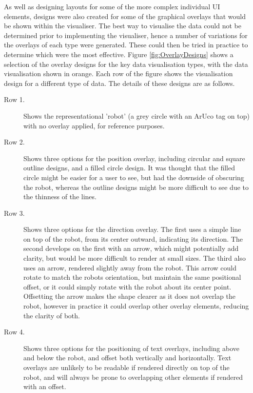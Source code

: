 As well as designing layouts for some of the more complex individual UI elements, designs were also created for some of the graphical overlays that would be shown within the visualiser. The best way to visualise the data could not be determined prior to implementing the visualiser, hence a number of variations for the overlays of each type were generated. These could then be tried in practice to determine which were the most effective. Figure \ref{fig:OverlayDesigns} shows a selection of the overlay designs for the key data visualisation types, with the data visualisation shown in orange. Each row of the figure shows the visualisation design for a different type of data. The details of these designs are as follows.

\begin{description}
\item [Row 1.] Shows the representational 'robot' (a grey circle with an ArUco tag on top) with no overlay applied, for reference purposes. 

\item [Row 2.] Shows three options for the position overlay, including circular and square outline designs, and a filled circle design. It was thought that the filled circle might be easier for a user to see, but had the downside of obscuring the robot, whereas the outline designs might be more difficult to see due to the thinness of the lines.

\item [Row 3.] Shows three options for the direction overlay. The first uses a simple line on top of the robot, from its center outward, indicating its direction. The second develops on the first with an arrow, which might potentially add clarity, but would be more difficult to render at small sizes. The third also uses an arrow, rendered slightly away from the robot. This arrow could rotate to match the robots orientation, but maintain the same positional offset, or it could simply rotate with the robot about its center point. Offsetting the arrow makes the shape clearer as it does not overlap the robot, however in practice it could overlap other overlay elements, reducing the clarity of both. 

\item [Row 4.] Shows three options for the positioning of text overlays, including above and below the robot, and offset both vertically and horizontally. Text overlays are unlikely to be readable if rendered directly on top of the robot, and will always be prone to overlapping other elements if rendered with an offset. 


\end{description}
